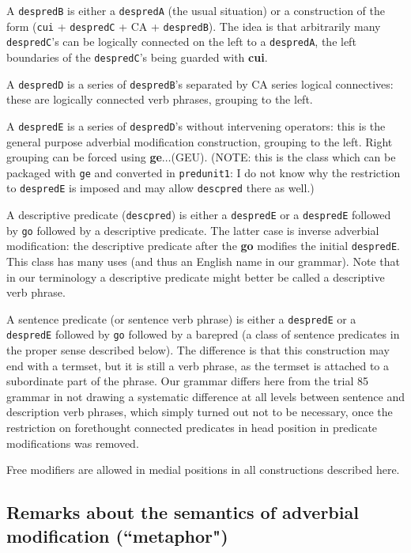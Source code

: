 \documentclass[12pt]{book}
\begin{document}
{A {\tt despredB} is either a {\tt despredA} (the usual situation)
or a construction of the form ({\tt cui} + {\tt despredC} + CA + {\tt despredB}).   The idea is that arbitrarily many {\tt despredC}'s can be logically connected on the left to a {\tt despredA}, the left boundaries of the {\tt despredC}'s being guarded with {\bf cui}.

A {\tt despredD} is a series of {\tt despredB}'s separated by CA series logical connectives:  these are logically connected verb phrases,
grouping to the left.

A {\tt despredE} is a series of {\tt despredD}'s without intervening operators:  this is the general purpose adverbial modification construction, grouping to the left.  Right grouping can be forced using {\bf ge}$\ldots$(GEU).  (NOTE:  this is the class which can be packaged with {\tt ge} and converted in
{\tt predunit1}:  I do not know why the restriction to {\tt despredE} is imposed and may allow {\tt descpred} there as well.)

A descriptive predicate ({\tt descpred}) is either a {\tt despredE} or a {\tt despredE} followed by {\tt go} followed by a descriptive predicate.  The latter case is inverse adverbial modification:  the descriptive predicate after the {\bf go} modifies the initial {\tt despredE}.  This class has many uses (and thus an English name in our grammar).  Note that in our terminology a descriptive predicate might better be called a descriptive verb phrase.

A sentence predicate (or sentence verb phrase) is either a {\tt despredE} or a {\tt despredE} followed by {\tt go} followed by a barepred (a class of sentence predicates in the proper sense described below).  The difference is that this construction may end with a termset, but it is still a verb phrase,
as the termset is attached to a subordinate part of the phrase.  Our grammar differs here from the trial 85 grammar in not drawing a systematic difference at all levels between sentence and description verb phrases, which simply turned out not to be necessary, once the restriction
on forethought connected predicates in head position in predicate modifications was removed.

Free modifiers are allowed in medial positions in all constructions described here.

\subsection{Remarks about the semantics of adverbial modification (``metaphor")}

}
\end{document}
